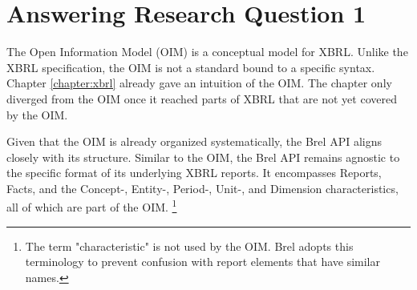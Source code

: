 \section{Answering Research Question 1}
\label{sec:answer_research_question_1}

The Open Information Model (OIM) is a conceptual model for XBRL.\cite{oim}
Unlike the XBRL specification, the OIM is not a standard bound to a specific syntax.
Chapter \ref{chapter:xbrl} already gave an intuition of the OIM.
The chapter only diverged from the OIM once it reached parts of XBRL that are not yet covered by the OIM.

Given that the OIM is already organized systematically, the Brel API aligns closely with its structure. 
Similar to the OIM, the Brel API remains agnostic to the specific format of its underlying XBRL reports. 
It encompasses Reports, Facts, and the Concept-, Entity-, Period-, Unit-, and Dimension characteristics, 
all of which are part of the OIM. 
\footnote{The term "characteristic" is not used by the OIM. Brel adopts this terminology to prevent confusion with report elements that have similar names.}

